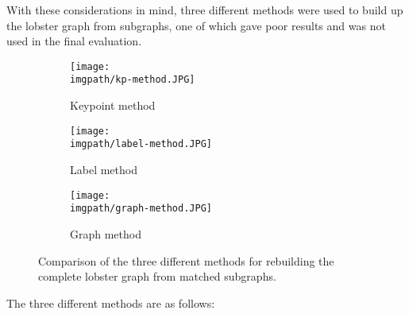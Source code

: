 \n
With these considerations in mind, three different methods were used to build up the lobster graph from subgraphs, one of which gave poor results and was not used in the final evaluation. 
\begin{figure}[H]
\centering
	\begin{subfigure}{0.32\textwidth}
	\texttt{[image: \\imgpath/kp-method.JPG]}
	\caption{Keypoint method}	
	\end{subfigure}
	\hspace*{\fill}
	\begin{subfigure}{0.32\textwidth}
	\texttt{[image: \\imgpath/label-method.JPG]}
	\caption{Label method}
	\end{subfigure}
	\hspace*{\fill}
	\begin{subfigure}{0.32\textwidth}
	\texttt{[image: \\imgpath/graph-method.JPG]}
	\caption{Graph method}
	\end{subfigure}
\caption{Comparison of the three different methods for rebuilding the complete lobster graph from matched subgraphs.}
\end{figure}
\noindent
The three different methods are as follows:
